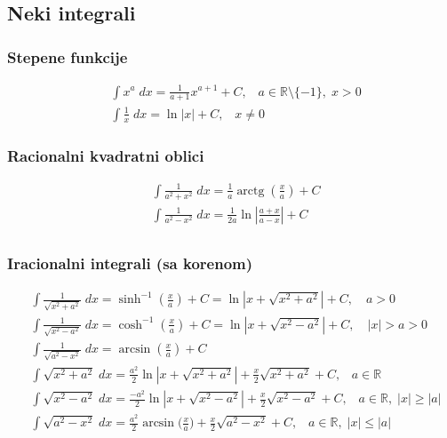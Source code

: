 \documentclass[a4paper,12pt,twoside]{report}
\numberwithin{algorithm}{section}
\renewcommand{\arctan}{\operatorname{arctg}}
\begin{document}
\subsection{Neki integrali}
\subsubsection{Stepene funkcije}
\[
    \begin{aligned}
        &\int x^a\; dx = \frac{1}{a+1}x^{a+1} + C,\;\;\;a\in \mathbb{R}\setminus\{-1\},\;x>0\\[8pt]
        &\int \frac{1}{x} \;dx = \ln |x| + C,\;\;\;x\neq 0
    \end{aligned}
\]
\subsubsection{Racionalni kvadratni oblici}
\[
    \begin{aligned}
        &\int \frac{1}{a^2 + x^2}\;dx = \frac{1}{a} \arctan \left(\frac{x}{a}\right) + C\\[8pt]
        &\int \frac{1}{a^2 - x^2}\;dx = \frac{1}{2a}\ln\left|\frac{a+x}{a-x}\right| + C\\[8pt]
    \end{aligned}
\]



\subsubsection{Iracionalni integrali (sa korenom)}
\[
    \begin{aligned}
        &\int \frac{1}{\sqrt{x^2 + a^2}}\;dx = \sinh^{-1}\left(\frac{x}{a}\right) + C = \ln\left|x + \sqrt{x^2 + a^2}\right| + C, \quad a > 0\\[8pt]
        &\int \frac{1}{\sqrt{x^2 - a^2}}\;dx = \cosh^{-1}\left(\frac{x}{a}\right) + C = \ln\left|x + \sqrt{x^2 - a^2}\right| + C, \quad |x| > a > 0\\[8pt]
        &\int \frac{1}{\sqrt{a^2-x^2}}\;dx = \arcsin\left(\frac{x}{a}\right) + C\\[8pt]
        &\int \sqrt{x^2+a^2}\;dx = \frac{a^2}{2}\ln\left|x+\sqrt{x^2+a^2}\right| + \frac{x}{2}\sqrt{x^2 + a^2} + C,\;\;\;a\in \mathbb{R} \\[8pt]
        &\int \sqrt{x^2-a^2}\;dx = \frac{-a^2}{2}\ln\left|x+\sqrt{x^2 - a^2}\right| + \frac{x}{2}\sqrt{x^2 - a^2} + C,\;\;\;a\in \mathbb{R}, \;|x| \geq |a| \\[8pt]
        &\int \sqrt{a^2-x^2}\;dx = \frac{a^2}{2}\arcsin\bigg(\frac{x}{a}\bigg) + \frac{x}{2}\sqrt{a^2-x^2} + C,\;\;\;a\in \mathbb{R}, \;|x| \leq |a|
    \end{aligned}
\]
\end{document}
